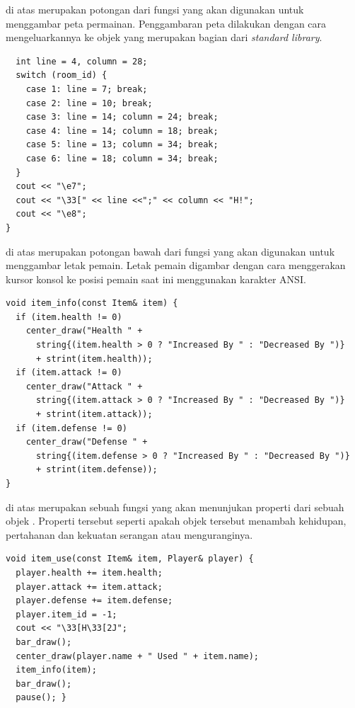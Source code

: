 \documentclass[../main.tex]{subfiles}
\begin{document}
{\Script} di atas merupakan potongan dari fungsi  yang akan digunakan untuk menggambar peta permainan. Penggambaran peta dilakukan dengan cara mengeluarkannya ke objek  {\header} {\file} yang merupakan bagian dari \textit{standard library}.

\begin{code}
\begin{verbatim}
  int line = 4, column = 28;
  switch (room_id) {
    case 1: line = 7; break;
    case 2: line = 10; break;
    case 3: line = 14; column = 24; break;
    case 4: line = 14; column = 18; break;
    case 5: line = 13; column = 34; break;
    case 6: line = 18; column = 34; break;
  }
  cout << "\e7";
  cout << "\33[" << line <<";" << column << "H!";
  cout << "\e8";
}
\end{verbatim}
\end{code}

{\Script} di atas merupakan potongan bawah dari fungsi  yang akan digunakan untuk menggambar letak pemain. Letak pemain digambar dengan cara menggerakan kursor konsol ke posisi pemain saat ini menggunakan karakter ANSI.

\begin{code}
\begin{verbatim}
void item_info(const Item& item) {
  if (item.health != 0) 
    center_draw("Health " +
      string{(item.health > 0 ? "Increased By " : "Decreased By ")}
      + strint(item.health));
  if (item.attack != 0)
    center_draw("Attack " +
      string{(item.attack > 0 ? "Increased By " : "Decreased By ")}
      + strint(item.attack));
  if (item.defense != 0)
    center_draw("Defense " +
      string{(item.defense > 0 ? "Increased By " : "Decreased By ")}
      + strint(item.defense));
}
\end{verbatim}
\end{code}

{\Script} di atas merupakan sebuah fungsi yang akan menunjukan properti dari sebuah objek . Properti tersebut seperti apakah objek  tersebut menambah kehidupan, pertahanan dan kekuatan serangan atau menguranginya.

\begin{code}
\begin{verbatim}
void item_use(const Item& item, Player& player) {
  player.health += item.health;
  player.attack += item.attack;
  player.defense += item.defense;
  player.item_id = -1;
  cout << "\33[H\33[2J";
  bar_draw();
  center_draw(player.name + " Used " + item.name);
  item_info(item);
  bar_draw();
  pause(); }
\end{verbatim}
\end{code}
\end{document}
